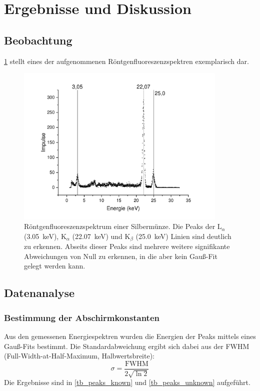 \documentclass[
	a4paper,
	12pt,
	pagesize,
	ngerman
]{scrartcl}
\begin{document}
	\section{Ergebnisse und Diskussion}
	

	\subsection{Beobachtung}
	\cref{fig_ag_plot} stellt eines der aufgenommenen Röntgenfluoreszenzspektren exemplarisch dar.
	
	\begin{figure}[H]
		\includegraphics[width=0.9\textwidth]{images/Silbermuenze}
		\centering
		\caption{Röntgenfluoreszenzspektrum einer Silbermünze. Die Peaks der $\text{L}_\alpha$ (\SI{3,05}{\kilo \electronvolt}), $\text{K}_\alpha$ (\SI{22,07}{\kilo \electronvolt}) und $\text{K}_\beta$ (\SI{25,0}{\kilo \electronvolt}) Linien sind deutlich zu erkennen. Abseits dieser Peaks sind mehrere weitere signifikante Abweichungen von Null zu erkennen, in die aber kein Gauß-Fit gelegt werden kann.}
		\label{fig_ag_plot}
		\centering
	\end{figure}
	
	\subsection{Datenanalyse}
	\subsubsection{Bestimmung der Abschirmkonstanten}
	Aus den gemessenen Energiespektren wurden die Energien der Peaks mittels eines Gauß-Fits bestimmt.
	Die Standardabweichung ergibt sich dabei aus der FWHM (Full-Width-at-Half-Maximum, Halbwertsbreite):
	\begin{equation}
		\sigma = \frac{\text{FWHM}}{2\sqrt{\ln 2}}
	\end{equation}
	Die Ergebnisse sind in \cref{tb_peaks_known} und \cref{tb_peaks_unknown} aufgeführt.
	
\end{document}
